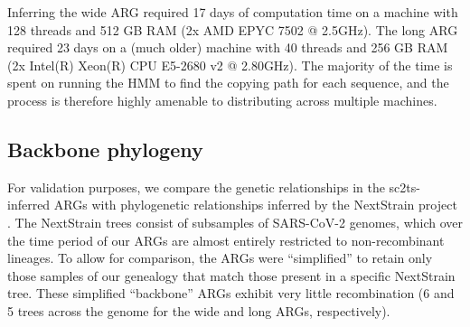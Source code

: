 \documentclass{article}
\begin{document}
Inferring the wide ARG required 17 days of computation time on a machine
with 128 threads and 512 GB RAM (2x AMD EPYC 7502 @ 2.5GHz).
The long ARG required 23 days on a (much older) machine
with 40 threads and 256 GB RAM (2x Intel(R) Xeon(R) CPU E5-2680 v2 @ 2.80GHz).
The majority of the time is spent on running the HMM to find the copying
path for each sequence, and the process is therefore highly amenable to
distributing across multiple machines.

\subsection{Backbone phylogeny}

For validation purposes, we compare the genetic relationships in the
sc2ts-inferred ARGs with phylogenetic relationships inferred by the NextStrain
project \citep{Hadfield2018-ef}. The NextStrain trees consist of subsamples of
SARS-CoV-2 genomes, which over the time period of our ARGs are almost entirely
restricted to non-recombinant lineages. To allow for comparison, the ARGs were
``simplified'' \citep{Kelleher2018-xc} to retain only those samples of our genealogy
that match those present in a specific NextStrain tree. These simplified
``backbone'' ARGs exhibit very little recombination (6 and 5 trees across the
genome for the wide and long ARGs, respectively).
\end{document}
